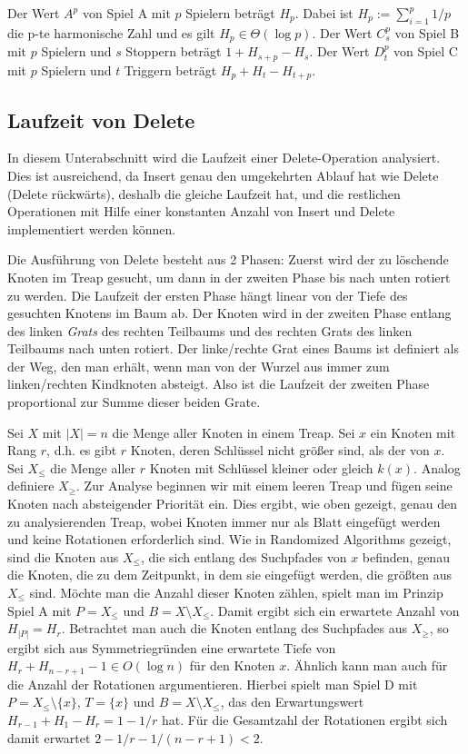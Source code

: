 \documentclass[a4paper]{scrreprt}
\theoremstyle{definition}
\begin{document}
Der Wert $A^p$ von Spiel A mit $p$ Spielern beträgt $H_p$. %
Dabei ist $H_p := \sum_{i=1}^p 1/p$ die p-te harmonische Zahl und es gilt $H_p \in \Theta(\log p)$. %
Der Wert $C_s^p$ von Spiel B mit $p$ Spielern und $s$ Stoppern beträgt $1 + H_{s+p} - H_s$.
Der  Wert $D_t^p$ von Spiel C mit $p$ Spielern und $t$ Triggern beträgt $H_p + H_t - H_{t+p}$.

\subsection{Laufzeit von Delete}
\label{sec:delruntime}
In diesem Unterabschnitt wird die Laufzeit einer Delete-Operation analysiert.
Dies ist ausreichend, da Insert genau den umgekehrten Ablauf hat wie Delete (\glqq Delete rückwärts\grqq), deshalb die gleiche Laufzeit hat, und die restlichen Operationen mit Hilfe einer konstanten Anzahl von Insert und Delete implementiert werden können. %

Die Ausführung von Delete besteht aus 2 Phasen:
Zuerst wird der zu löschende Knoten im Treap gesucht, um dann in der zweiten Phase bis nach unten rotiert zu werden.
Die Laufzeit der ersten Phase hängt linear von der Tiefe des gesuchten Knotens im Baum ab.
Der Knoten wird in der zweiten Phase entlang des linken \emph{Grats} des rechten Teilbaums und des rechten Grats des linken Teilbaums nach unten rotiert.
Der linke/rechte Grat eines Baums ist definiert als der Weg, den man erhält, wenn man von der Wurzel aus immer zum linken/rechten Kindknoten absteigt.
Also ist die Laufzeit der zweiten Phase proportional zur Summe dieser beiden Grate.

Sei $X$ mit $\left|X\right| = n$ die Menge aller Knoten in einem Treap.
Sei $x$ ein Knoten mit Rang $r$, d.h. es gibt $r$ Knoten, deren Schlüssel nicht größer sind, als der von $x$.
Sei $X_\leq$ die Menge aller $r$ Knoten mit Schlüssel kleiner oder gleich $k(x)$.
Analog definiere $X_\geq$.
Zur Analyse beginnen wir mit einem leeren Treap und fügen seine Knoten nach absteigender Priorität ein.
Dies ergibt, wie oben gezeigt, genau den zu analysierenden Treap, wobei Knoten immer nur als Blatt eingefügt werden und keine Rotationen erforderlich sind.
Wie in Randomized Algorithms\cite{TODO} gezeigt, sind die Knoten aus $X_\leq$, die sich entlang des Suchpfades von $x$ befinden, genau die Knoten, die zu dem Zeitpunkt, in dem sie eingefügt werden, die größten aus $X_\leq$ sind.
Möchte man die Anzahl dieser Knoten zählen, spielt man im Prinzip Spiel A mit $P = X_\leq$ und $B = X \setminus X_\leq$.
Damit ergibt sich ein erwartete Anzahl von $H_{\left|P\right|} = H_r$.
Betrachtet man auch die Knoten entlang des Suchpfades aus $X_\geq$, so ergibt sich aus Symmetriegründen eine erwartete Tiefe von $H_r + H_{n-r+1} - 1 \in O(\log n)$ für den Knoten $x$.
Ähnlich kann man auch für die Anzahl der Rotationen argumentieren.
Hierbei spielt man Spiel D mit $P = X_\leq \setminus \{x\}$, $T = \{x\}$ und $B = X \setminus X_\leq$, das den Erwartungswert $H_{r-1} + H_1 - H_r = 1 - 1/r$ hat.
Für die Gesamtzahl der Rotationen ergibt sich damit erwartet $2 - 1/r - 1/(n-r+1) < 2$.
\end{document}
